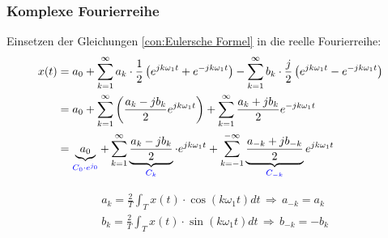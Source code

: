     


\subsubsection{\textbf{Komplexe Fourierreihe}}
Einsetzen der Gleichungen \ref{con:Eulersche Formel} in die reelle Fourierreihe:\\
\begin{equation}
\begin{aligned}
    x(t) &=a_{0}+\sum_{k=1}^{\infty} a_{k} \cdot \frac{1}{2}\left(e^{j k \omega_{1} t}+e^{-j k \omega_{1} t}\right)-\sum_{k=1}^{\infty} b_{k} \cdot \frac{j}{2}\left(e^{j k \omega_{1} t}-e^{-j k \omega_{1} t}\right) \\
         &=a_{0}+\sum_{k=1}^{\infty}\left(\frac{a_{k}-j b_{k}}{2} e^{j k \omega_{1} t}\right)+\sum_{k=1}^{\infty} \frac{a_{k}+j b_{k}}{2} e^{-j k \omega_{1} t} \\
         &=\underbrace{a_{0}}_{\textcolor{blue}{C_0 \cdot e^{j_0}}} +\sum_{k=1}^{\infty} \underbrace{\frac{a_{k}-j b_{k}}{2}}_{\textcolor{blue}{C_k} } \cdot e^{j k \omega_{1} t}+\sum_{k=-1}^{-\infty} \underbrace{\frac{a_{-k}+j b_{-k}}{2} }_{\textcolor{blue}{C_{-k}} }e^{j k \omega_{1} t}
\end{aligned}
\end{equation}

\begin{equation}
    \begin{aligned}
    &a_{k}=\frac{2}{T} \int_{T} x(t) \cdot \cos \left(k \omega_{1} t\right) d t \, \Rightarrow \, a_{-k}=a_{k} \\
    &b_{k}=\frac{2}{T} \int_{T} x(t) \cdot \sin \left(k \omega_{1} t\right) d t \, \Rightarrow \, b_{-k}=-b_{k}
    \end{aligned}
    \nonumber
\end{equation}

